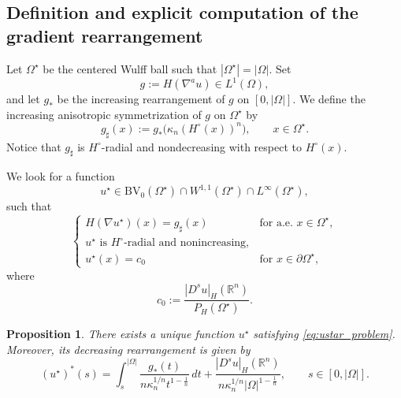 \documentclass[oneside,a4paper,12pt,notitlepage]{article}
\newtheorem{proposition}[theorem]{Proposition}
\theoremstyle{definition}
\newcommand{\BV}{\text{BV}}
\begin{document}
\subsection{Definition and explicit computation of the gradient rearrangement}
\label{subsec:existence}

Let $\Omega^\star$ be the centered Wulff ball such that $|\Omega^\star|=|\Omega|$.
Set
\[
g:=H(\nabla^a u)\in L^1(\Omega),
\]
and let $g_*$ be the increasing rearrangement of $g$ on $[0,|\Omega|]$. We define
the increasing anisotropic symmetrization of $g$ on $\Omega^\star$ by
\[
g_\sharp(x):=g_*\!\bigl(\kappa_n(H^\circ(x))^n\bigr),
\qquad x\in\Omega^\star .
\]
Notice that $g_\sharp$ is $H^\circ$-radial and nondecreasing with respect to
$H^\circ(x)$.

We look for a function
\[
u^\star \in \BV_0(\Omega^\star)\cap W^{1,1}(\Omega^\star)\cap L^\infty(\Omega^\star),
\]
such that
\begin{equation}\label{eq:ustar_problem}
\begin{cases}
H(\nabla u^\star)(x)=g_\sharp(x) & \text{for a.e. }x\in\Omega^\star,\\[1ex]
u^\star \text{ is } H^\circ\text{-radial and nonincreasing},\\[1ex]
u^\star(x)=c_0 & \text{for }x\in\partial\Omega^\star,
\end{cases}
\end{equation}
where
\begin{equation}\label{eq:boundary_constant}
c_0:=\frac{|D^s u|_H(\mathbb{R}^n)}{P_H(\Omega^\star)}.
\end{equation}

\begin{proposition}\label{prop:existence}
There exists a unique function $u^\star$ satisfying \eqref{eq:ustar_problem}.
Moreover, its decreasing rearrangement is given by
\begin{equation}\label{eq:ustar_rearrangement_explicit}
(u^\star)^*(s)
=
\int_s^{|\Omega|}
\frac{g_*(t)}{n\kappa_n^{1/n} t^{1-\frac1n}}\,dt
+
\frac{|D^s u|_H(\mathbb{R}^n)}{n\kappa_n^{1/n}|\Omega|^{1-\frac1n}},
\qquad s\in[0,|\Omega|].
\end{equation}
\end{proposition}
\end{document}
